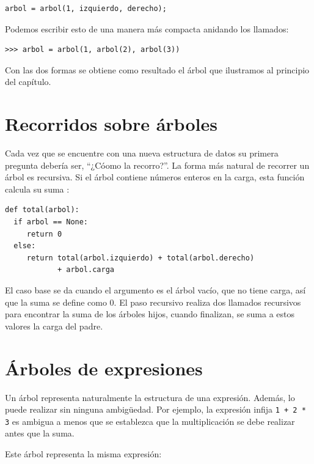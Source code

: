 \beforeverb 
\begin{verbatim}
arbol = arbol(1, izquierdo, derecho);
\end{verbatim}
\afterverb Podemos escribir esto de una manera más compacta anidando
los llamados:

\beforeverb 
\begin{verbatim}
>>> arbol = arbol(1, arbol(2), arbol(3))
\end{verbatim}
\afterverb Con las dos formas se obtiene como resultado el árbol
que ilustramos al principio del capítulo.

\section{Recorridos sobre árboles}

  

Cada vez que se encuentre con una nueva estructura de datos su primera
pregunta debería ser, ``¿Cóomo la recorro?''. La forma más natural
de recorrer un árbol es recursiva. Si el árbol contiene números enteros
en la carga, esta función calcula su suma :

\beforeverb 
\begin{verbatim}
def total(arbol):
  if arbol == None: 
     return 0
  else:
     return total(arbol.izquierdo) + total(arbol.derecho) 
            + arbol.carga
\end{verbatim}
\afterverb El caso base se da cuando el argumento es el árbol vacío,
que no tiene carga, así que la suma se define como 0. El paso recursivo
realiza dos llamados recursivos para encontrar la suma de los árboles
hijos, cuando finalizan, se suma a estos valores la carga del padre.

\section{Árboles de expresiones}

  
  

Un árbol representa naturalmente la estructura de una expresión. Además,
lo puede realizar sin ninguna ambigüedad. Por ejemplo, la expresión
infija \texttt{1 + 2 {*} 3} es ambigua a menos que se establezca que
la multiplicación se debe realizar antes que la suma.

Este árbol representa la misma expresión:

